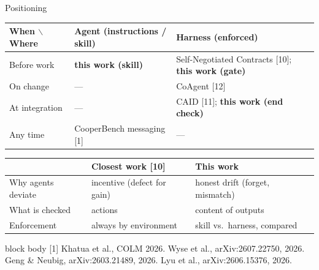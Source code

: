 \documentclass[aspectratio=169,11pt]{beamer}
\newcommand{\papercite}[1]{%
  \vfill
  \begin{beamercolorbox}[wd=\textwidth,sep=3pt]{block body}
    \tiny #1
  \end{beamercolorbox}}
\begin{document}
\begin{frame}{Positioning}
  \footnotesize
  \centering
  \begin{tabularx}{\textwidth}{l X X}
    \toprule
    When $\backslash$ Where & Agent (instructions / skill) & Harness (enforced) \\
    \midrule
    Before work & \textbf{this work (skill)} & Self-Negotiated Contracts [10]; \textbf{this work (gate)} \\
    On change & --- & CoAgent [12] \\
    At integration & --- & CAID [11]; \textbf{this work (end check)} \\
    Any time & CooperBench messaging [1] & --- \\
    \bottomrule
  \end{tabularx}

  \vspace{0.8em}
  \begin{tabular}{lll}
    \toprule
    & Closest work [10] & This work \\
    \midrule
    Why agents deviate & incentive (defect for gain) & honest drift (forget, mismatch) \\
    What is checked & actions & content of outputs \\
    Enforcement & always by environment & skill vs.\ harness, compared \\
    \bottomrule
  \end{tabular}
  \papercite{[1] Khatua et al., COLM 2026. \; [10] Wyse et al., arXiv:2607.22750, 2026. \; [11] Geng \& Neubig, arXiv:2603.21489, 2026. \; [12] Lyu et al., arXiv:2606.15376, 2026.}
\end{frame}

\end{document}
